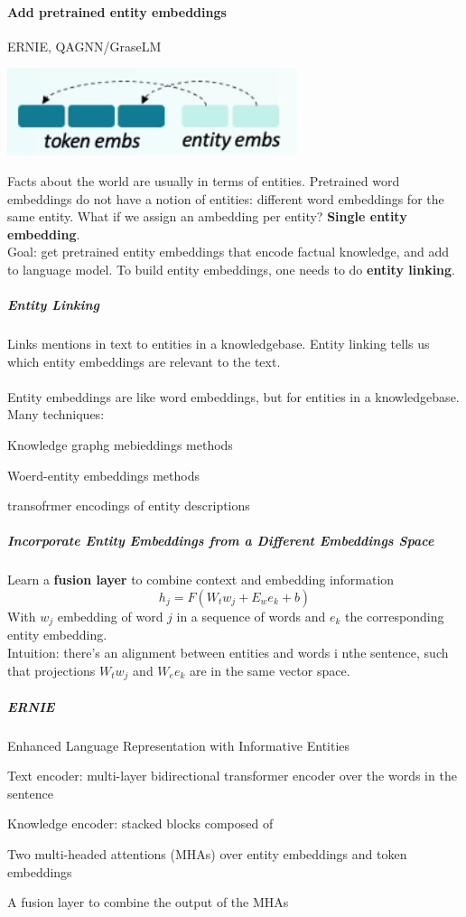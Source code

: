 \documentclass[10pt]{report}
\begin{document}
\paragraph{Add pretrained entity embeddings} ERNIE, QAGNN/GraseLM
\begin{center}
	\includegraphics[scale=0.5]{106.png}
\end{center}
Facts about the world are usually in terms of entities. Pretrained word embeddings do not have a notion of entities: different word embeddings for the same entity. What if we assign an ambedding per entity? \textbf{Single entity embedding}.\\
Goal: get pretrained entity embeddings that encode factual knowledge, and add to language model. To build entity embeddings, one needs to do \textbf{entity linking}.
\subparagraph{Entity Linking} Links mentions in text to entities in a knowledgebase. Entity linking tells us which entity embeddings are relevant to the text.\\\\
Entity embeddings are like word embeddings, but for entities in a knowledgebase. Many techniques:
\begin{list}{}{}
	\item Knowledge graphg mebieddings methods
	\item Woerd-entity embeddings methods
	\item transofrmer encodings of entity descriptions
\end{list}
\subparagraph{Incorporate Entity Embeddings from a Different Embeddings Space} Learn a \textbf{fusion layer} to combine context and embedding information
$$h_j  = F(W_tw_j + E_we_k + b)$$
With $w_j$ embedding of word $j$ in a sequence of words and $e_k$ the corresponding entity embedding.\\
Intuition: there's an alignment between entities and words i nthe sentence, such that projections $W_tw_j$ and $W_ee_k$ are in the same vector space.
\subparagraph{ERNIE} Enhanced Language Representation with Informative Entities
\begin{list}{}{}
	\item Text encoder: multi-layer bidirectional transformer encoder over the words in the sentence
	\item Knowledge encoder: stacked blocks composed of
	\begin{list}{}{}
		\item Two multi-headed attentions (MHAs) over entity embeddings and token embeddings
		\item A fusion layer to combine the output of the MHAs
	\end{list}
\end{list}
\end{document}
